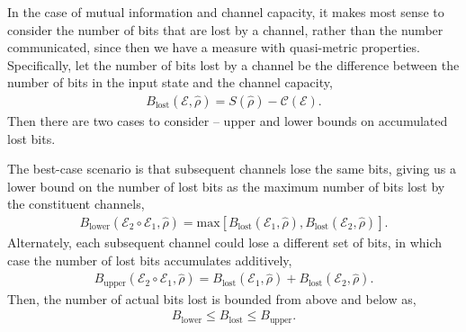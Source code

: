 In the case of mutual information and channel capacity, it makes most sense to consider the number of bits that are lost by a channel, rather than the number communicated, since then we have a measure with quasi-metric properties. Specifically, let the number of bits lost by a channel be the difference between the number of bits in the input state and the channel capacity,
\begin{align}
B_\mathrm{lost}(\mathcal{E},\hat\rho) = S(\hat\rho) - \mathcal{C}(\mathcal{E}).
\end{align}
Then there are two cases to consider -- upper and lower bounds on accumulated lost bits.

The best-case scenario is that subsequent channels lose the same bits, giving us a lower bound on the number of lost bits as the maximum number of bits lost by the constituent channels,
\begin{align}
B_\mathrm{lower}(\mathcal{E}_2\circ\mathcal{E}_1,\hat\rho) = \mathrm{max}[B_\mathrm{lost}(\mathcal{E}_1,\hat\rho), B_\mathrm{lost}(\mathcal{E}_2,\hat\rho)].
\end{align}
Alternately, each subsequent channel could lose a different set of bits, in which case the number of lost bits accumulates additively,
\begin{align}
B_\mathrm{upper}(\mathcal{E}_2\circ\mathcal{E}_1,\hat\rho) = B_\mathrm{lost}(\mathcal{E}_1,\hat\rho) + B_\mathrm{lost}(\mathcal{E}_2,\hat\rho). 
\end{align}
Then, the number of actual bits lost is bounded from above and below as,
\begin{align}
B_\mathrm{lower} \leq B_\mathrm{lost} \leq B_\mathrm{upper}.	
\end{align}


%
%

